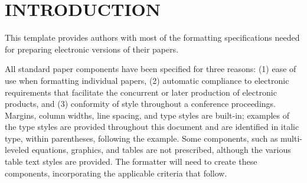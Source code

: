 \section{INTRODUCTION}

This template provides authors with most of the formatting specifications needed for preparing electronic versions of their papers. 

All standard paper components have been specified for three reasons: (1) ease of use when formatting individual papers, (2) automatic compliance to electronic requirements that facilitate the concurrent or later production of electronic products, and (3) conformity of style throughout a conference proceedings. 
Margins, column widths, line spacing, and type styles are built-in; examples of the type styles are provided throughout this document and are identified in italic type, within parentheses, following the example. 
Some components, such as multi-leveled equations, graphics, and tables are not prescribed, although the various table text styles are provided.
The formatter will need to create these components, incorporating the applicable criteria that follow\cite{tezza2019state}.
